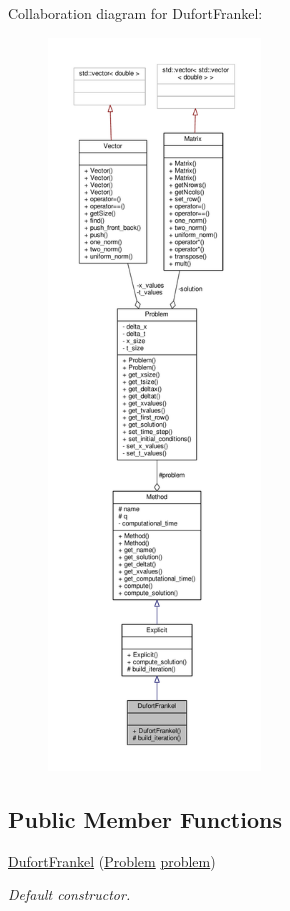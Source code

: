 Collaboration diagram for Dufort\+Frankel\+:
\nopagebreak
\begin{figure}[H]
\begin{center}
\leavevmode
\includegraphics[height=550pt]{classDufortFrankel__coll__graph}
\end{center}
\end{figure}
\subsection*{Public Member Functions}
\begin{DoxyCompactItemize}
\item 
\hyperlink{classDufortFrankel_a3da0cebb23f1c23c8656b5d39824b22b}{Dufort\+Frankel} (\hyperlink{classProblem}{Problem} \hyperlink{classMethod_a29a08a679b5d30a8c813766308205041}{problem})
\begin{DoxyCompactList}\small\item\em Default constructor. \end{DoxyCompactList}\end{DoxyCompactItemize}
